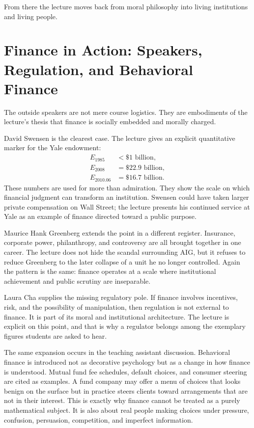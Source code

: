 From there the lecture moves back from moral philosophy into living institutions and living people.

\section{Finance in Action: Speakers, Regulation, and Behavioral Finance}

The outside speakers are not mere course logistics. They are embodiments of the lecture's thesis that finance is socially embedded and morally charged.

David Swensen is the clearest case. The lecture gives an explicit quantitative marker for the Yale endowment:
\begin{equation}
\begin{aligned}
E_{1985} &< \$1\text{ billion}, \\
E_{2008} &= \$22.9\text{ billion}, \\
E_{2010.06} &= \$16.7\text{ billion}.
\end{aligned}
\end{equation}
These numbers are used for more than admiration. They show the scale on which financial judgment can transform an institution. Swensen could have taken larger private compensation on Wall Street; the lecture presents his continued service at Yale as an example of finance directed toward a public purpose.

Maurice Hank Greenberg extends the point in a different register. Insurance, corporate power, philanthropy, and controversy are all brought together in one career. The lecture does not hide the scandal surrounding AIG, but it refuses to reduce Greenberg to the later collapse of a unit he no longer controlled. Again the pattern is the same: finance operates at a scale where institutional achievement and public scrutiny are inseparable.

Laura Cha supplies the missing regulatory pole. If finance involves incentives, risk, and the possibility of manipulation, then regulation is not external to finance. It is part of its moral and institutional architecture. The lecture is explicit on this point, and that is why a regulator belongs among the exemplary figures students are asked to hear.

The same expansion occurs in the teaching assistant discussion. Behavioral finance is introduced not as decorative psychology but as a change in how finance is understood. Mutual fund fee schedules, default choices, and consumer steering are cited as examples. A fund company may offer a menu of choices that looks benign on the surface but in practice steers clients toward arrangements that are not in their interest. This is exactly why finance cannot be treated as a purely mathematical subject. It is also about real people making choices under pressure, confusion, persuasion, competition, and imperfect information.


